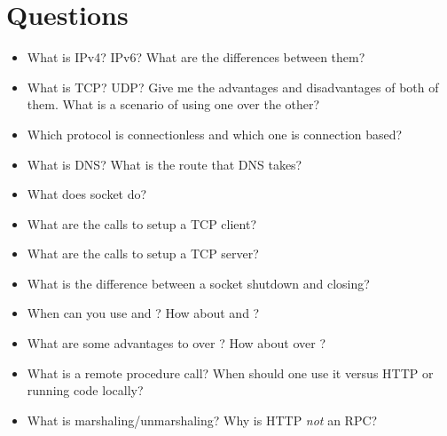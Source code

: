 \section{Questions}

\begin{itemize}
\item
  What is IPv4? IPv6? What are the differences between them?
\item
  What is TCP? UDP? Give me the advantages and disadvantages of both of them.
  What is a scenario of using one over the other?
\item
  Which protocol is connectionless and which one is connection based?
\item
  What is DNS? What is the route that DNS takes?
\item
  What does socket do?
\item
  What are the calls to setup a TCP client?
\item
  What are the calls to setup a TCP server?
\item
  What is the difference between a socket shutdown and closing?
\item
  When can you use  and ? How about  and ?
\item
  What are some advantages to  over ? How about  over ?
\item
  What is a remote procedure call? When should one use it versus HTTP or running code locally?
\item
  What is marshaling/unmarshaling? Why is HTTP \emph{not} an RPC?
\end{itemize}



